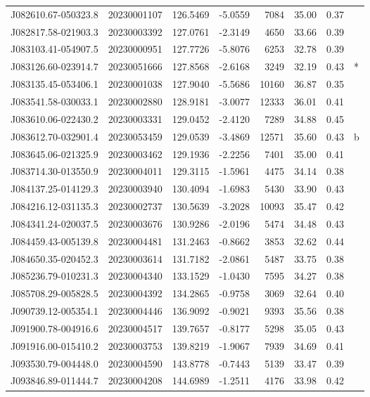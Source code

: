 \documentclass{article}
\begin{document}
\begin {longtable}{|l|l|r|r|r|r|r|l|}
 J082610.67-050323.8&  20230001107&  126.5469&   -5.0559&  7084& 35.00& 0.37&\\
 J082817.58-021903.3&  20230003392&  127.0761&   -2.3149&  4650& 33.66& 0.39&\\
 J083103.41-054907.5&  20230000951&  127.7726&   -5.8076&  6253& 32.78& 0.39&\\
 J083126.60-023914.7&  20230051666&  127.8568&   -2.6168&  3249& 32.19& 0.43&*\\%
 J083135.45-053406.1&  20230001038&  127.9040&   -5.5686& 10160& 36.87& 0.35&\\
 J083541.58-030033.1&  20230002880&  128.9181&   -3.0077& 12333& 36.01& 0.41&\\
 J083610.06-022430.2&  20230003331&  129.0452&   -2.4120&  7289& 34.88& 0.45&\\
 J083612.70-032901.4&  20230053459&  129.0539&   -3.4869& 12571& 35.60& 0.43&b\\%
 J083645.06-021325.9&  20230003462&  129.1936&   -2.2256&  7401& 35.00& 0.41&\\
 J083714.30-013550.9&  20230004011&  129.3115&   -1.5961&  4475& 34.14& 0.38&\\
 J084137.25-014129.3&  20230003940&  130.4094&   -1.6983&  5430& 33.90& 0.43&\\
 J084216.12-031135.3&  20230002737&  130.5639&   -3.2028& 10093& 35.47& 0.42&\\
 J084341.24-020037.5&  20230003676&  130.9286&   -2.0196&  5474& 34.48& 0.43&\\
 J084459.43-005139.8&  20230004481&  131.2463&   -0.8662&  3853& 32.62& 0.44&\\
 J084650.35-020452.3&  20230003614&  131.7182&   -2.0861&  5487& 33.75& 0.38&\\
 J085236.79-010231.3&  20230004340&  133.1529&   -1.0430&  7595& 34.27& 0.38&\\%
 J085708.29-005828.5&  20230004392&  134.2865&   -0.9758&  3069& 32.64& 0.40&\\
 J090739.12-005354.1&  20230004446&  136.9092&   -0.9021&  9393& 35.56& 0.38&\\
 J091900.78-004916.6&  20230004517&  139.7657&   -0.8177&  5298& 35.05& 0.43&\\
 J091916.00-015410.2&  20230003753&  139.8219&   -1.9067&  7939& 34.69& 0.41&\\
 J093530.79-004448.0&  20230004590&  143.8778&   -0.7443&  5139& 33.47& 0.39&\\
 J093846.89-011444.7&  20230004208&  144.6989&   -1.2511&  4176& 33.98& 0.42&\\

\end{longtable}
\end{document}
